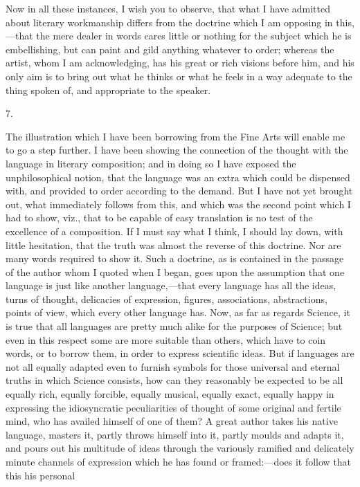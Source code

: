Now in all these instances, I wish you to observe, that what I have
admitted about literary workmanship differs from the doctrine which I
am opposing in this,—that the mere dealer in words cares little or
nothing for the subject which he is embellishing, but can paint and
gild anything whatever to order; whereas the artist, whom I am
acknowledging, has his great or rich visions before him, and his only
aim is to bring out what he thinks or what he feels in a way adequate
to the thing spoken of, and appropriate to the speaker.

7.

The illustration which I have been borrowing from the Fine Arts
will enable me to go a step further. I have been showing the
connection of the thought with the language in literary composition;
and in doing so I have exposed the unphilosophical notion, that the
language was an extra which could be dispensed with, and provided to
order according to the demand. But I have not yet brought out, what
immediately follows from this, and which was the second point
which I had to show, viz., that to be capable of easy translation is
no test of the excellence of a composition. If I must say what I
think, I should lay down, with little hesitation, that the truth was
almost the reverse of this doctrine. Nor are many words required to
show it. Such a doctrine, as is contained in the passage of the author
whom I quoted when I began, goes upon the assumption that one language
is just like another language,—that every language has all the
ideas, turns of thought, delicacies of expression, figures,
associations, abstractions, points of view, which every other language
has. Now, as far as regards Science, it is true that all languages are
pretty much alike for the purposes of Science; but even in this
respect some are more suitable than others, which have to coin words,
or to borrow them, in order to express scientific ideas. But if
languages are not all equally adapted even to furnish symbols for
those universal and eternal truths in which Science consists, how can
they reasonably be expected to be all equally rich, equally forcible,
equally musical, equally exact, equally happy in expressing the
idiosyncratic peculiarities of thought of some original and fertile
mind, who has availed himself of one of them? A great author takes his
native language, masters it, partly throws himself into it, partly
moulds and adapts it, and pours out his multitude of ideas through the
variously ramified and delicately minute channels of expression which
he has found or framed:—does it follow that this his personal
